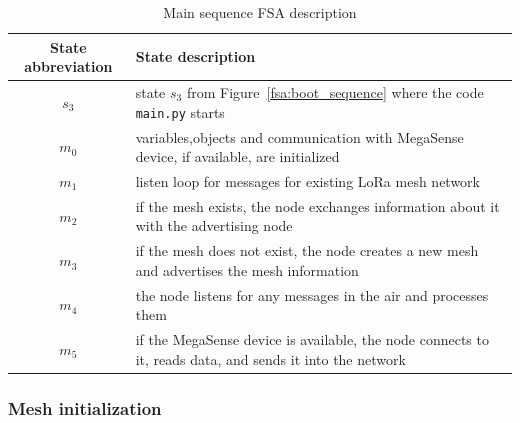 				\begin{table}[h]
					\begin{center}
						\begin{tabular}{|c|m{10.2cm}|} 
							\hline
							\textbf{State abbreviation} & \textbf{State description} \\\hline
							$s_{3}$ & state $s_{3}$ from Figure~\ref{fsa:boot_sequence} where the code \texttt{main.py} starts\\\hline
							$m_{0}$ & variables,objects and communication with MegaSense device, if available, are initialized\\\hline
							$m_{1}$ & listen loop for messages for existing LoRa mesh network\\\hline
							$m_{2}$ & if the mesh exists, the node exchanges information about it with the advertising node\\\hline
							$m_{3}$ & if the mesh does not exist, the node creates a new mesh and advertises the mesh information\\\hline
							$m_{4}$ & the node listens for any messages in the air and processes them\\\hline
							$m_{5}$ & if the MegaSense device is available, the node connects to it, reads data, and sends it into the network\\\hline
						\end{tabular}
						\caption{Main sequence FSA description}
						\label{table:fsa_main}
					\end{center}
				\end{table}
			
			
				
			\subsubsection{Mesh initialization}
			
